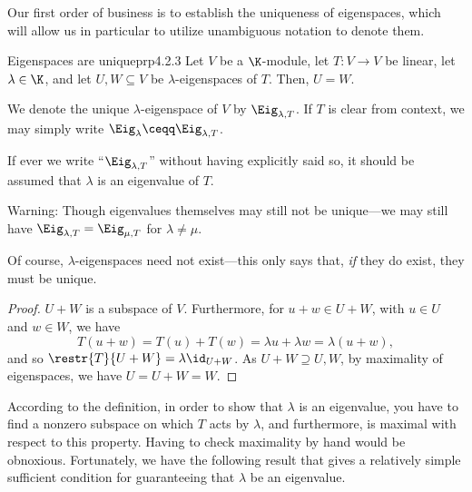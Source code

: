 Our first order of business is to establish the uniqueness of eigenspaces, which will allow us in particular to utilize unambiguous notation to denote them.
\begin{prp}{Eigenspaces are unique}{prp4.2.3}
	Let $V$ be a $\K$-module, let $T\colon V\rightarrow V$ be linear, let $\lambda \in \K$, and let $U,W\subseteq V$ be $\lambda$-eigenspaces of $T$.  Then, $U=W$.
	\begin{rmk}
		We denote the unique $\lambda$-eigenspace of $V$ by $\Eig _{\lambda ,T}$.  If $T$ is clear from context, we may simply write $\Eig _{\lambda}\ceqq \Eig _{\lambda ,T}$.
	\end{rmk}
	\begin{rmk}
		If ever we write ``$\Eig _{\lambda ,T}$'' without having explicitly said so, it should be assumed that $\lambda$ is an eigenvalue of $T$.
	\end{rmk}
	\begin{rmk}
		Warning:  Though eigenvalues themselves may still not be unique---we may still have $\Eig _{\lambda ,T}=\Eig _{\mu ,T}$ for $\lambda \neq \mu$.
	\end{rmk}
	\begin{rmk}
		Of course, $\lambda$-eigenspaces need not exist---this only says that, \emph{if} they do exist, they must be unique.
	\end{rmk}
	\begin{proof}
		$U+W$ is a subspace of $V$.  Furthermore, for $u+w\in U+W$, with $u\in U$ and $w\in W$, we have
		\begin{equation}
			T(u+w)=T(u)+T(w)=\lambda u+\lambda w=\lambda (u+w),
		\end{equation}
		and so $\restr{T}{U+W}=\lambda \id _{U+W}$.  As $U+W\supseteq U,W$, by maximality of eigenspaces, we have $U=U+W=W$.
	\end{proof}
\end{prp}
According to the definition, in order to show that $\lambda$ is an eigenvalue, you have to find a nonzero subspace on which $T$ acts by $\lambda$, and furthermore, is maximal with respect to this property.  Having to check maximality by hand would be obnoxious.  Fortunately, we have the following result that gives a relatively simple sufficient condition for guaranteeing that $\lambda$ be an eigenvalue.
